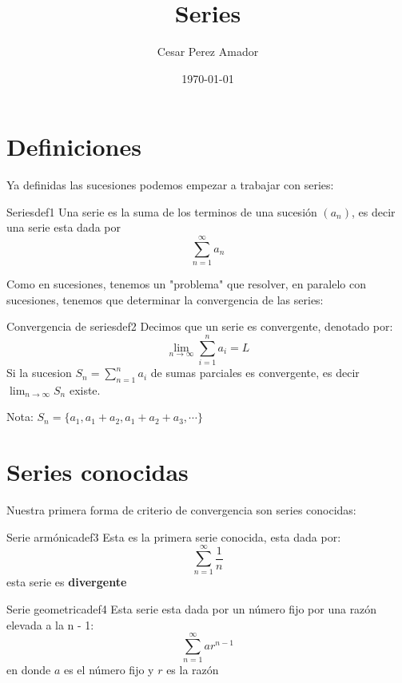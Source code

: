 \documentclass[12pt,a4paper]{article}
\title{\Huge Series}
\author{Cesar Perez Amador}
\date{\today}
\begin{document}
\maketitle

\section{Definiciones}

Ya definidas las sucesiones podemos empezar a trabajar con series: 

\begin{definicion}{Series}{def1}
    Una serie es la suma de los terminos de una sucesión $(a_n)$, es decir una serie esta dada por 
    \[ 
        \sum_{n = 1}^{\infty} a_n
    \]
\end{definicion}

Como en sucesiones, tenemos un "problema" que resolver, en paralelo con sucesiones, tenemos que determinar la convergencia de las series:

\begin{definicion}{Convergencia de series}{def2}
    Decimos que un serie es convergente, denotado por:
    \[ 
        \lim_{n \to \infty} \sum_{i = 1}^{n} a_i = L
    \]
    Si la sucesion $S_n = \sum_{n = 1}^n a_i$ de sumas parciales es convergente, es decir $\lim_{n \to \infty} S_n$ existe. 
\end{definicion}

Nota: $S_n = \{a_1, a_1 + a_2, a_1 + a_2 + a_3, \cdots \}$

\section{Series conocidas}

Nuestra primera forma de criterio de convergencia son series conocidas:

\begin{definicion}{Serie armónica}{def3}
    Esta es la primera serie conocida, esta dada por:
    \[ 
        \sum_{n = 1}^{\infty} \frac{1}{n} 
    \]
    esta serie es \textbf{divergente}
\end{definicion}

\begin{definicion}{Serie geometrica}{def4}
    Esta serie esta dada por un número fijo por una razón elevada a la n - 1:
    \[ 
        \sum_{n = 1}^{\infty} ar^{n - 1} 
    \]
    en donde $a$ es el número fijo y $r$ es la razón
\end{definicion}
\end{document}
